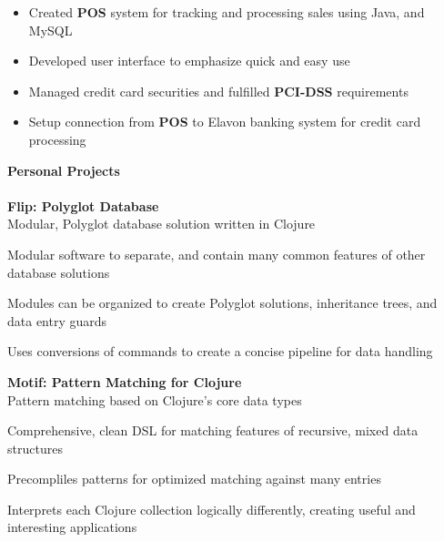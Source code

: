 \documentclass[12pt]{article}
\begin{document}
\begin{itemize}
	\item[$\circ$] \small{Created \textbf{POS} system for tracking and processing sales using Java, and MySQL}
	\item[$\circ$] \small{Developed user interface to emphasize quick and easy use}
	\item[$\circ$] \small{Managed credit card securities and fulfilled \textbf{PCI-DSS} requirements}
	\item[$\circ$] \small{Setup connection from \textbf{POS} to Elavon banking system for credit card processing}
\end{itemize}
\vspace{2mm}
\large{\textbf{Personal Projects}}\\\\
\small{\textbf{Flip: Polyglot Database}}\\
\hspace*{6mm}\footnotesize{Modular, Polyglot database solution written in Clojure}
\begin{itemize}
	\small{\item[$\circ$] Modular software to separate, and contain many common features of other database solutions}
	\small{\item[$\circ$] Modules can be organized to create Polyglot solutions, inheritance trees, and data entry guards}
	\small{\item[$\circ$] Uses conversions of commands to create a concise pipeline for data handling}
\end{itemize}
\vspace{1mm}
\small{\textbf{Motif: Pattern Matching for Clojure}}\\
\hspace*{6mm}\footnotesize{Pattern matching based on Clojure's core data types}
\begin{itemize}
	\small{\item[$\circ$] Comprehensive, clean DSL for matching features of recursive, mixed data structures}
	\small{\item[$\circ$] Precompliles patterns for optimized matching against many entries }
	\small{\item[$\circ$] Interprets each Clojure collection logically differently, creating useful and interesting applications}
\end{itemize}
\end{document}
